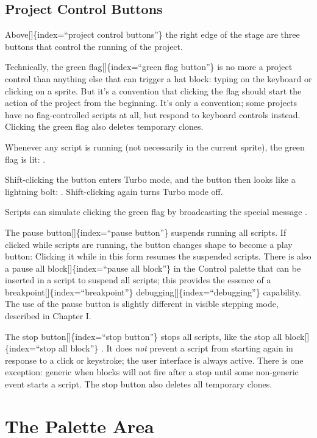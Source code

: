 \documentclass[
  letterpaper,
]{book}
\begin{document}
\subsection{Project Control Buttons}\label{project-control-buttons}

Above{[}{]}\{index=``project control buttons''\} the right edge of the
stage are three buttons that control the running of the project.

Technically, the green flag{[}{]}\{index=``green flag button''\} is no
more a project control than anything else that can trigger a hat block:
typing on the keyboard or clicking on a sprite. But it's a convention
that clicking the flag should start the action of the project from the
beginning. It's only a convention; some projects have no flag-controlled
scripts at all, but respond to keyboard controls instead. Clicking the
green flag also deletes temporary clones.

Whenever any script is running (not necessarily in the current sprite),
the green flag is lit: .

Shift-clicking the button enters Turbo mode, and the button then looks
like a lightning bolt: . Shift-clicking again turns Turbo mode off.

Scripts can simulate clicking the green flag by broadcasting the special
message .

The pause button{[}{]}\{index=``pause button''\} suspends running all
scripts. If clicked while scripts are running, the button changes shape
to become a play button: Clicking it while in this form resumes the
suspended scripts. There is also a pause all block{[}{]}\{index=``pause
all block''\} in the Control palette that can be inserted in a script to
suspend all scripts; this provides the essence of a
breakpoint{[}{]}\{index=``breakpoint''\}
debugging{[}{]}\{index=``debugging''\} capability. The use of the pause
button is slightly different in visible stepping mode, described in
Chapter I.

The stop button{[}{]}\{index=``stop button''\} stops all scripts, like
the stop all block{[}{]}\{index=``stop all block''\} . It does
\emph{not} prevent a script from starting again in response to a click
or keystroke; the user interface is always active. There is one
exception: generic when blocks will not fire after a stop until some
non-generic event starts a script. The stop button also deletes all
temporary clones.

\section{The Palette Area}\label{the-palette-area}
\end{document}
